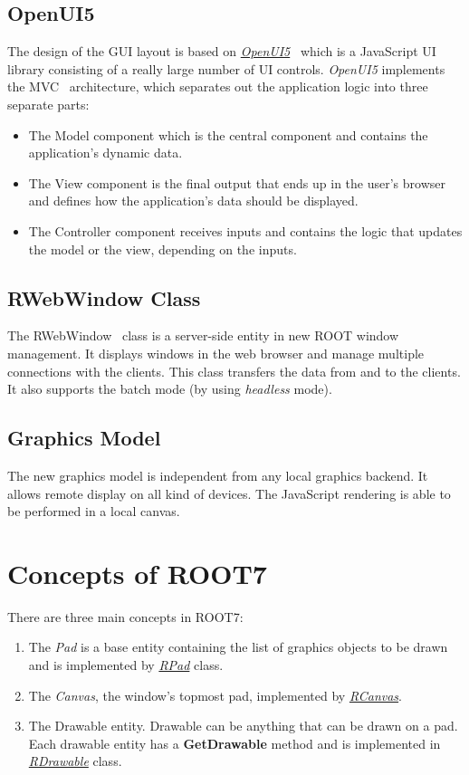 \documentclass[a4paper]{jpconf}
\begin{document}
\subsection{OpenUI5}
The design of the GUI layout is based on \textit{\href{https://openui5.hana.ondemand.com/}{OpenUI5}}~\cite{openui} which is a JavaScript UI library consisting of a really large number of UI controls. \textit{OpenUI5} implements the MVC~\cite{mvc} architecture, which separates out the application logic into three separate parts:
\begin{itemize}
  \item The Model component which is the central component and contains the application's dynamic data.
  \item The View component is the final output that ends up in the user's browser and defines how the application's data should be displayed.
  \item The Controller component receives inputs and contains the logic that updates the model or the view, depending on the inputs.
\end{itemize}

\subsection{RWebWindow Class}
The RWebWindow~\cite{rweb} class is a server-side entity in new ROOT window management. It displays windows in the web browser and manage multiple connections with the clients. This class transfers the data from and to the clients. It also supports the batch mode (by using \textit{headless} mode).

 \subsection{Graphics Model}

 The new graphics model is independent from any local graphics backend. It allows remote display on all kind of devices. The JavaScript rendering is able to be performed in a local canvas.

\section{Concepts of ROOT7}
There are three main concepts in ROOT7:
\begin{enumerate}[label=\alph*)]
  \item The \textit{Pad} is a base entity containing the list of graphics objects to be drawn and is implemented by \textit{\href{https://root.cern.ch/doc/master/classROOT_1_1Experimental_1_1RPad.html}{RPad}} class.
  \item The \textit{Canvas}, the window's topmost pad, implemented by \textit{\href{https://root.cern.ch/doc/master/classROOT_1_1Experimental_1_1RCanvas.html}{RCanvas}}.
  \item The Drawable entity. Drawable can be anything that can be drawn on a pad. Each drawable entity has a \textbf{GetDrawable} method and is implemented in \textit{\href{https://root.cern.ch/doc/master/classROOT_1_1Experimental_1_1RDrawable.html}{RDrawable}} class.
\end{enumerate}
\end{document}
